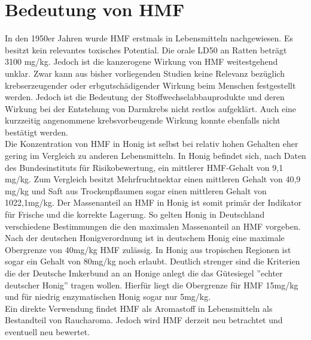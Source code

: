 \section{Bedeutung von HMF}
In den 1950er Jahren wurde HMF erstmals in Lebensmitteln nachgewiesen. Es besitzt kein relevantes toxisches Potential. Die orale LD50 an Ratten beträgt 3100 mg/kg. Jedoch ist die kanzerogene Wirkung von HMF weitestgehend unklar. Zwar kann aus bisher vorliegenden Studien keine Relevanz bezüglich krebserzeugender oder erbgutschädigender Wirkung beim Menschen festgestellt werden. Jedoch ist die Bedeutung der Stoffwechselabbauprodukte und deren Wirkung bei der Entstehung von Darmkrebs nicht restlos aufgeklärt. Auch eine kurzzeitig angenommene krebsvorbeugende Wirkung konnte ebenfalls nicht bestätigt werden.
\\
Die Konzentration von HMF in Honig ist selbst bei relativ hohen Gehalten eher gering im Vergleich zu anderen Lebensmitteln. In Honig befindet sich, nach Daten des Bundesinstituts für Risikobewertung, ein mittlerer HMF-Gehalt von 9,1 mg/kg. Zum Vergleich besitzt Mehrfruchtnektar einen mittleren Gehalt von 40,9 mg/kg und Saft aus Trockenpflaumen sogar einen mittleren Gehalt von 1022,1mg/kg. Der Massenanteil an HMF in Honig ist somit primär der Indikator für Frische und die korrekte Lagerung. So gelten Honig in Deutschland verschiedene Bestimmungen die den maximalen Massenanteil an HMF vorgeben. Nach der deutschen Honigverordnung ist in deutschem Honig eine maximale Obergrenze von 40mg/kg HMF zulässig. In Honig aus tropischen Regionen ist sogar ein Gehalt von 80mg/kg noch erlaubt. Deutlich strenger sind die Kriterien die der Deutsche Imkerbund an an Honige anlegt die das Gütesiegel ''echter deutscher Honig'' tragen wollen. Hierfür liegt die Obergrenze für HMF 15mg/kg und für niedrig enzymatischen Honig sogar nur 5mg/kg.
\\
Ein direkte Verwendung findet HMF als Aromastoff in Lebensmitteln als Bestandteil von Raucharoma. Jedoch wird HMF derzeit neu betrachtet und eventuell neu bewertet.~\cite{BfR}


